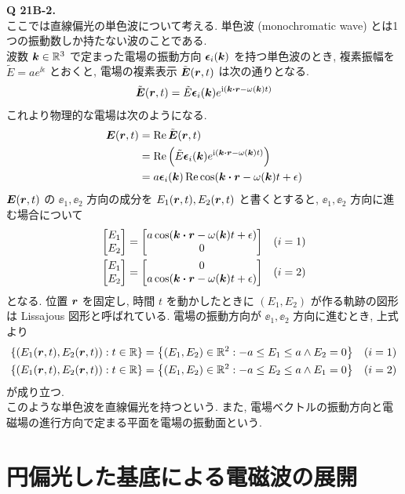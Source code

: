 \documentclass[a4paper,dvipdfmx]{jsarticle}
\theoremstyle{definition}
\begin{document}
\textbf{Q 21B-2.} \\
ここでは直線偏光の単色波について考える. 単色波 (monochromatic wave) とは1つの振動数しか持たない波のことである. \\
波数 $\vb*{k}\in\mathbb{R}^3$ で定まった電場の振動方向 $\vb*{\epsilon}_i(\vb*{k})$ を持つ単色波のとき, 複素振幅を $\tilde{E} = ae^{\ii\epsilon}$ とおくと, 電場の複素表示 $\tilde{\vb*{E}}(\vb*{r}, t)$ は次の通りとなる.
\begin{align}
  \tilde{\EE}(\rr, t) = \tilde{E}\ee_i(\kk)e^{\ii(\kk\vdot\rr-\omega(\kk)t)}
\end{align}
これより物理的な電場は次のようになる.
\begin{align}
  \EE(\rr, t) & = \Re\tilde{\EE}(\rr, t)                                               \\
              & = \Re\left(\tilde{E}\ee_i(\kk)e^{\ii(\kk\vdot\rr-\omega(\kk)t)}\right) \\
              & = a\ee_i(\kk)\Re\cos(\kk\vdot\rr-\omega(\kk)t + \epsilon)
\end{align}
$\vb*{E}(\vb*{r}, t)$ の $\ee_1, \ee_2$ 方向の成分を $E_1(\vb*{r}, t), E_2(\vb*{r}, t)$ と書くとすると, $\ee_1, \ee_2$ 方向に進む場合について
\begin{align}
  \mqty[E_1 \\ E_2] &= \mqty[a\cos(\kk\vdot\rr - \omega(\kk)t + \epsilon) \\ 0] & (i = 1) \\
  \mqty[E_1 \\ E_2] &= \mqty[0 \\ a\cos(\kk\vdot\rr - \omega(\kk)t + \epsilon)] & (i = 2)
\end{align}
となる. 位置 $\vb*{r}$ を固定し, 時間 $t$ を動かしたときに $(E_1, E_2)$ が作る軌跡の図形は Lissajous 図形と呼ばれている. 電場の振動方向が $\ee_1, \ee_2$ 方向に進むとき, 上式より
\begin{align}
  \qty{\qty(E_1(\vb*{r}, t), E_2(\vb*{r}, t)):t\in\mathbb{R}} & = \qty{\qty(E_1,E_2)\in\mathbb{R}^2:-a\leq E_1\leq a\land E_2 = 0} & (i = 1) \\
  \qty{\qty(E_1(\vb*{r}, t), E_2(\vb*{r}, t)):t\in\mathbb{R}} & = \qty{\qty(E_1,E_2)\in\mathbb{R}^2:-a\leq E_2\leq a\land E_1 = 0} & (i = 2)
\end{align}
が成り立つ. \\
このような単色波を直線偏光を持つという. また, 電場ベクトルの振動方向と電磁場の進行方向で定まる平面を電場の振動面という.


\section{円偏光した基底による電磁波の展開}
\end{document}
